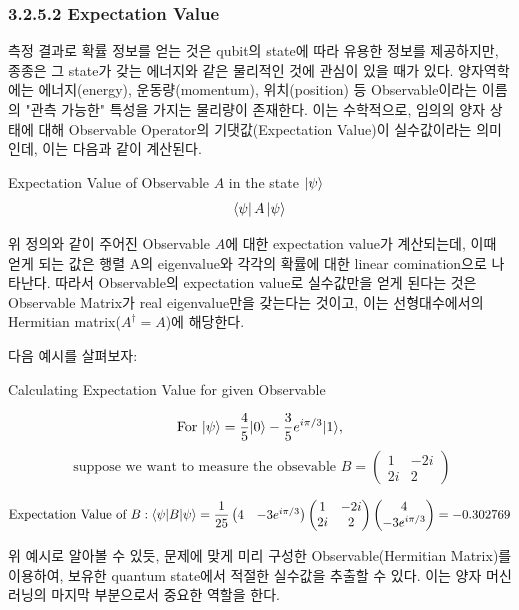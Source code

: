 \subsubsection{3.2.5.2 \quad Expectation Value}

측정 결과로 확률 정보를 얻는 것은 qubit의 state에 따라 유용한 정보를 제공하지만, 종종은 그 state가 갖는 에너지와 같은 물리적인 것에 관심이 있을 때가 있다. 양자역학에는 에너지(energy), 운동량(momentum), 위치(position) 등 Observable이라는 이름의 "관측 가능한" 특성을 가지는 물리량이 존재한다. 이는 수학적으로, 임의의 양자 상태에 대해 Observable Operator의 기댓값(Expectation Value)이 실수값이라는 의미인데, 이는 다음과 같이 계산된다.
\begin{definition}
    Expectation Value of Observable \(A\) in the state \(\ket \psi\)
    \[
        \bra{\psi}A\ket{\psi}
    \]
\end{definition}

위 정의와 같이 주어진 Observable \(A\)에 대한 expectation value가 계산되는데, 이때 얻게 되는 값은 행렬 A의 eigenvalue와 각각의 확률에 대한 linear comination으로 나타난다. 따라서 Observable의 expectation value로 실수값만을 얻게 된다는 것은 Observable Matrix가 real eigenvalue만을 갖는다는 것이고, 이는 선형대수에서의 Hermitian matrix(\(A^\dagger = A\))에 해당한다.

\noindent 다음 예시를 살펴보자:

\begin{example} Calculating Expectation Value for given Observable

\[
    \text{For } |\psi\rangle = {4\over 5}|0\rangle - {3 \over 5}e^{i\pi / 3}|1\rangle,
\]
\[
\text{ suppose we want to measure the obsevable } B = \left( \begin{matrix}
    1 & -2i \\
    2i & 2
    \end{matrix}\right)
\]

\begin{align*}
    \text{Expectation Value of } B : \langle\psi|B|\psi\rangle = {1 \over 25} \left(\begin{matrix}4 & -3e^{i\pi/3}\end{matrix}\right)\left(\begin{matrix}
        1 & -2i \\
        2i & 2
        \end{matrix}\right)\left(\begin{matrix} 4 \\ -3e^{i\pi /3}\end{matrix}\right) = -0.302769
\end{align*}

\end{example}
위 예시로 알아볼 수 있듯, 문제에 맞게 미리 구성한 Observable(Hermitian Matrix)를 이용하여, 보유한 quantum state에서 적절한 실수값을 추출할 수 있다. 이는 양자 머신러닝의 마지막 부분으로서 중요한 역할을 한다.

